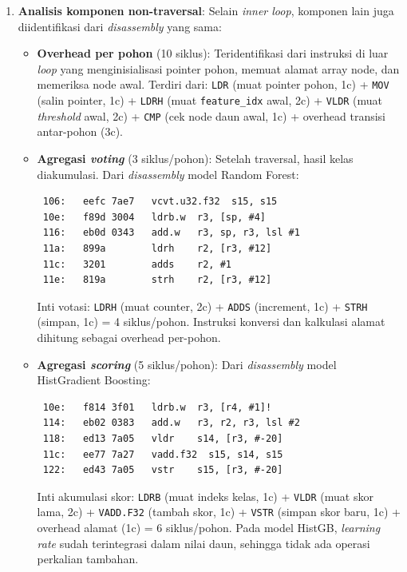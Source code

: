 \begin{enumerate}
    \item \textbf{Analisis komponen non-traversal}: Selain \textit{inner loop}, komponen lain juga diidentifikasi dari \textit{disassembly} yang sama:

    \begin{itemize}
        \item \textbf{Overhead per pohon} (10 siklus): Teridentifikasi dari instruksi di luar \textit{loop} yang menginisialisasi pointer pohon, memuat alamat array node, dan memeriksa node awal. Terdiri dari: \texttt{LDR} (muat pointer pohon, 1c) + \texttt{MOV} (salin pointer, 1c) + \texttt{LDRH} (muat \texttt{feature\_idx} awal, 2c) + \texttt{VLDR} (muat \textit{threshold} awal, 2c) + \texttt{CMP} (cek node daun awal, 1c) + overhead transisi antar-pohon (3c).

        \item \textbf{Agregasi \textit{voting}} (3 siklus/pohon): Setelah traversal, hasil kelas diakumulasi. Dari \textit{disassembly} model Random Forest:
\begin{verbatim}
 106:   eefc 7ae7   vcvt.u32.f32  s15, s15
 10e:   f89d 3004   ldrb.w  r3, [sp, #4]
 116:   eb0d 0343   add.w   r3, sp, r3, lsl #1
 11a:   899a        ldrh    r2, [r3, #12]
 11c:   3201        adds    r2, #1
 11e:   819a        strh    r2, [r3, #12]
\end{verbatim}
        Inti votasi: \texttt{LDRH} (muat counter, 2c) + \texttt{ADDS} (increment, 1c) + \texttt{STRH} (simpan, 1c) = 4 siklus/pohon. Instruksi konversi dan kalkulasi alamat dihitung sebagai overhead per-pohon.

        \item \textbf{Agregasi \textit{scoring}} (5 siklus/pohon): Dari \textit{disassembly} model HistGradient Boosting:
\begin{verbatim}
 10e:   f814 3f01   ldrb.w  r3, [r4, #1]!
 114:   eb02 0383   add.w   r3, r2, r3, lsl #2
 118:   ed13 7a05   vldr    s14, [r3, #-20]
 11c:   ee77 7a27   vadd.f32  s15, s14, s15
 122:   ed43 7a05   vstr    s15, [r3, #-20]
\end{verbatim}
        Inti akumulasi skor: \texttt{LDRB} (muat indeks kelas, 1c) + \texttt{VLDR} (muat skor lama, 2c) + \texttt{VADD.F32} (tambah skor, 1c) + \texttt{VSTR} (simpan skor baru, 1c) + overhead alamat (1c) = 6 siklus/pohon. Pada model HistGB, \textit{learning rate} sudah terintegrasi dalam nilai daun, sehingga tidak ada operasi perkalian tambahan.


\end{itemize}
\end{enumerate}
